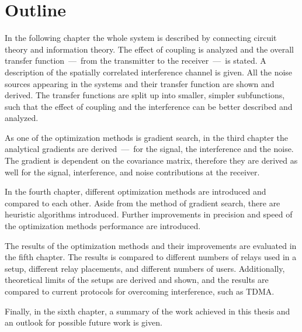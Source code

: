 \section{Outline}
\label{sec:outline}

In the following chapter the whole system is described by connecting circuit theory and information theory.
The effect of coupling is analyzed and the overall transfer function~---~from the transmitter to the receiver~---~is stated.
A description of the spatially correlated interference channel is given.
All the noise sources appearing in the systems and their transfer function are shown and derived.
The transfer functions are split up into smaller, simpler subfunctions, such that the effect of coupling and the interference can be better described and analyzed.

As one of the optimization methods is gradient search, in the third chapter the analytical gradients are derived~---~for the signal, the interference and the noise.
The gradient is dependent on the covariance matrix, therefore they are derived as well for the signal, interference, and noise contributions at the receiver.

In the fourth chapter, different optimization methods are introduced and compared to each other.
Aside from the method of gradient search, there are heuristic algorithms introduced.
Further improvements in precision and speed of the optimization methods performance are introduced.

The results of the optimization methods and their improvements are evaluated in the fifth chapter.
The results is compared to different numbers of relays used in a setup, different relay placements, and different numbers of users.
Additionally, theoretical limits of the setups are derived and shown, and the results are compared to current protocols for overcoming interference, such as TDMA.

Finally, in the sixth chapter, a summary of the work achieved in this thesis and an outlook for possible future work is given.







